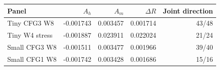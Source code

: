 {\small\setlength{\tabcolsep}{3pt}
\begin{tabular}{lrrrr}
\hline
Panel & $A_h$ & $A_m$ & $\Delta R$ & Joint direction \\
\hline
Tiny CFG3 W8 & -0.001743 & 0.003457 & 0.001714 & 43/48 \\
Tiny W4 stress & -0.001887 & 0.023911 & 0.022024 & 21/24 \\
Small CFG3 W8 & -0.001511 & 0.003477 & 0.001966 & 39/40 \\
Small CFG1 W8 & -0.001742 & 0.003428 & 0.001686 & 15/16 \\
\hline
\end{tabular}
}
